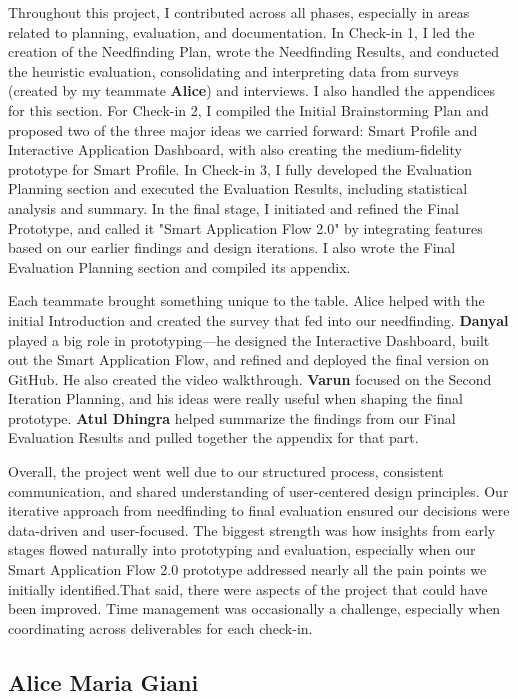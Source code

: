 \documentclass[
	letterpaper, %
]{jdf}
\begin{document}
\begin{sloppypar}
Throughout this project, I contributed across all phases, especially in areas related to planning, evaluation, and documentation. In Check-in 1, I led the creation of the Needfinding Plan, wrote the Needfinding Results, and conducted the heuristic evaluation, consolidating and interpreting data from surveys (created by my teammate \textbf{Alice}) and interviews. I also handled the appendices for this section. For Check-in 2, I compiled the Initial Brainstorming Plan and proposed two of the three major ideas we carried forward: Smart Profile and Interactive Application Dashboard, with also creating the medium-fidelity prototype for Smart Profile. In Check-in 3, I fully developed the Evaluation Planning section and executed the Evaluation Results, including statistical analysis and summary. In the final stage, I initiated and refined the Final Prototype, and called it "Smart Application Flow 2.0" by integrating features based on our earlier findings and design iterations. I also wrote the Final Evaluation Planning section and compiled its appendix.

Each teammate brought something unique to the table. Alice helped with the initial Introduction and created the survey that fed into our needfinding. \textbf{Danyal} played a big role in prototyping—he designed the Interactive Dashboard, built out the Smart Application Flow, and refined and deployed the final version on GitHub. He also created the video walkthrough. \textbf{Varun} focused on the Second Iteration Planning, and his ideas were really useful when shaping the final prototype. \textbf{Atul Dhingra} helped summarize the findings from our Final Evaluation Results and pulled together the appendix for that part. 

Overall, the project went well due to our structured process, consistent communication, and shared understanding of user-centered design principles. Our iterative approach from needfinding to final evaluation ensured our decisions were data-driven and user-focused. The biggest strength was how insights from early stages flowed naturally into prototyping and evaluation, especially when our Smart Application Flow 2.0 prototype addressed nearly all the pain points we initially identified.That said, there were aspects of the project that could have been improved. Time management was occasionally a challenge, especially when coordinating across deliverables for each check-in.

\newpage

\subsection{Alice Maria Giani}


\end{sloppypar}
\end{document}
